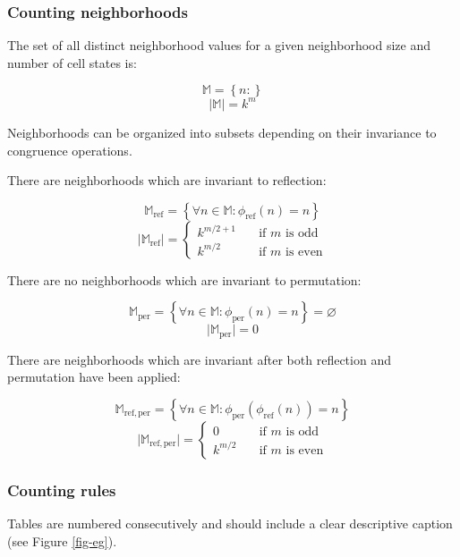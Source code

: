 \documentclass{ijuc}
\begin{document}
\subsubsection{Counting neighborhoods}

The set of all distinct neighborhood values for a given neighborhood size and number of cell states is:

\[ \mathbb{M} = \left\{ n : \right\} \]
\[ \vert \mathbb{M} \vert = k^m \]

Neighborhoods can be organized into subsets depending on their invariance to congruence operations.

There are neighborhoods which are invariant to reflection:

\[ \mathbb{M}_\mathrm{ref} = \left\{ \forall n \in \mathbb{M} : \phi_\mathrm{ref}(n) = n \right\} \]
\[ \vert \mathbb{M}_\mathrm{ref} \vert = \left\{ 
  \begin{array}{ll}
    {k^{m/2+1}} & \quad \textrm{if $m$ is odd }\\
    {k^{m/2  }} & \quad \textrm{if $m$ is even}
  \end{array} \right.
\]

There are no neighborhoods which are invariant to permutation:

\[ \mathbb{M}_\mathrm{per} = \left\{ \forall n \in \mathbb{M} : \phi_\mathrm{per}(n) = n \right\} = \varnothing \]
\[ \vert \mathbb{M}_\mathrm{per} \vert = 0 \]

There are neighborhoods which are invariant after both reflection and permutation have been applied:

\[ \mathbb{M}_\mathrm{ref,per} = \left\{ \forall n \in \mathbb{M} : \phi_\mathrm{per}(\phi_\mathrm{ref}(n)) = n \right\} \]
\[ \vert \mathbb{M}_\mathrm{ref,per} \vert = \left\{ 
  \begin{array}{ll}
    {0        } & \quad \textrm{if $m$ is odd }\\
    {k^{m/2  }} & \quad \textrm{if $m$ is even}
  \end{array} \right.
\]

\subsubsection{Counting rules}

Tables are numbered consecutively and should include a clear
descriptive caption (see Figure \ref{fig-eg}).
\end{document}
